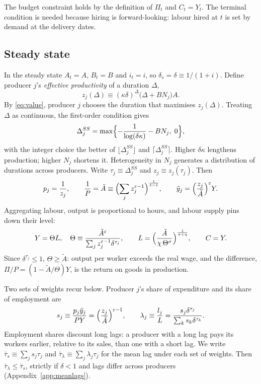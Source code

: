 \documentclass[11pt]{article}
\theoremstyle{definition}
\begin{document}
\noindent The budget constraint holds by the definition of $\Pi_t$ and $C_t=Y_t$. The terminal
condition is needed because hiring is forward-looking: labour hired at $t$ is set by demand at the
delivery dates.

\subsection{Steady state}\label{sec:ss}

In the steady state $A_t=A$, $B_t=B$ and $i_t=i$, so $\delta_s=\delta\equiv1/(1+i)$. Define
producer $j$'s \emph{effective productivity} of a duration $\Delta$,
\begin{equation}\label{eq:effprod}
  z_j(\Delta)\equiv(\kappa\delta)^{\Delta}\bigl(\Delta+BN_j\bigr)A .
\end{equation}
By \eqref{eq:value}, producer $j$ chooses the duration that maximises $z_j(\Delta)$. Treating
$\Delta$ as continuous, the first-order condition gives
\begin{equation}\label{eq:ssdur}
  \Delta_j^{SS}=\max\Bigl\{-\frac{1}{\log(\delta\kappa)}-BN_j,\;0\Bigr\},
\end{equation}
with the integer choice the better of $\lfloor\Delta_j^{SS}\rfloor$ and $\lceil\Delta_j^{SS}\rceil$.
Higher $\delta\kappa$ lengthens production; higher $N_j$ shortens it. Heterogeneity in $N_j$
generates a distribution of durations across producers. Write $\tau_j\equiv\Delta_j^{SS}$ and
$z_j\equiv z_j(\tau_j)$. Then
\begin{equation}\label{eq:ss}
  p_j=\frac{1}{z_j},\qquad \frac{1}{P}=\tilde A\equiv\Bigl(\sum_jz_j^{\varepsilon-1}\Bigr)^{\frac{1}{\varepsilon-1}},\qquad
  \tilde y_j=\Bigl(\frac{z_j}{\tilde A}\Bigr)^{\varepsilon}Y .
\end{equation}
Aggregating labour, output is proportional to hours, and labour supply pins down their level:
\begin{equation}\label{eq:ssL}
  Y=\Theta L,\quad \Theta\equiv\frac{\tilde A^{\varepsilon}}{\sum_jz_j^{\varepsilon-1}\delta^{\tau_j}},\qquad
  L=\Bigl(\frac{\tilde A}{\chi\,\Theta^{\sigma}}\Bigr)^{\frac{1}{\sigma+\eta}},\qquad C=Y .
\end{equation}
Since $\delta^{\tau_j}\le1$, $\Theta\ge\tilde A$: output per worker exceeds the real wage, and the
difference, $\Pi/P=(1-\tilde A/\Theta)Y$, is the return on goods in production.

Two sets of weights recur below. Producer $j$'s share of expenditure and its share of employment are
\begin{equation}\label{eq:weights}
  s_j\equiv\frac{p_j\tilde y_j}{PY}=\Bigl(\frac{z_j}{\tilde A}\Bigr)^{\varepsilon-1},\qquad
  \lambda_j\equiv\frac{l_j}{L}=\frac{s_j\delta^{\tau_j}}{\sum_ks_k\delta^{\tau_k}} .
\end{equation}
Employment shares discount long lags: a producer with a long lag pays its workers earlier, relative
to its sales, than one with a short lag. We write $\bar\tau_s\equiv\sum_js_j\tau_j$ and
$\bar\tau_\lambda\equiv\sum_j\lambda_j\tau_j$ for the mean lag under each set of weights. Then
$\bar\tau_\lambda\le\bar\tau_s$, strictly if $\delta<1$ and lags differ across producers
(Appendix~\ref{app:meanlags}).
\end{document}
